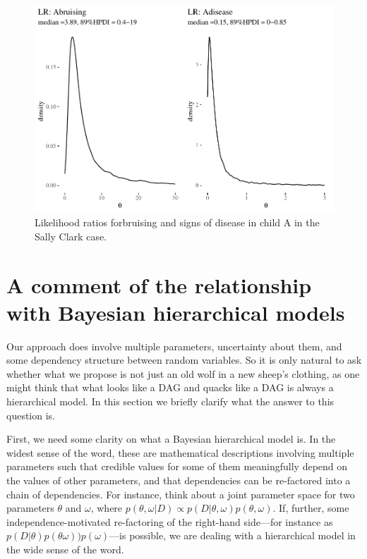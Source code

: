 \documentclass[
  10pt,
  dvipsnames,enabledeprecatedfontcommands]{scrartcl}
\begin{document}
\begin{figure}[H]


\begin{center}\includegraphics[width=0.9\linewidth]{imprecision_philosophical_paper2_files/figure-latex/SClrs-1} \end{center}

\caption{Likelihood ratios forbruising and signs of disease in child A in the Sally Clark case.}
\label{fig:SClrs}

\end{figure}

\section{A comment of the relationship with Bayesian hierarchical
models}\label{a-comment-of-the-relationship-with-bayesian-hierarchical-models}


Our approach does involve multiple parameters, uncertainty about them,
and some dependency structure between random variables. So it is only
natural to ask whether what we propose is not just an old wolf in a new
sheep's clothing, as one might think that what looks like a DAG and
quacks like a DAG is always a hierarchical model. In this section we
briefly clarify what the answer to this question is.

First, we need some clarity on what a Bayesian hierarchical model is. In
the widest sense of the word, these are mathematical descriptions
involving multiple parameters such that credible values for some of them
meaningfully depend on the values of other parameters, and that
dependencies can be re-factored into a chain of dependencies. For
instance, think about a joint parameter space for two parameters
\(\theta\) and \(\omega\), where
\(p(\theta, \omega \vert D) \propto p(D \vert \theta, \omega)p(\theta, \omega)\).
If, further, some independence-motivated re-factoring of the right-hand
side---for instance as
\(p(D\vert \theta)p(\theta \omega)) p (\omega)\)---is possible, we are
dealing with a hierarchical model in the wide sense of the word.
\end{document}
